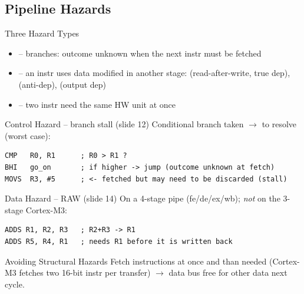 \multend

\subsection{Pipeline Hazards}

\begin{concept}{Three Hazard Types}
    \begin{itemize}
        \item {} -- branches: outcome unknown when the next instr
              must be fetched
        \item {} -- an instr uses data modified in another stage:
               (read-after-write, true dep), 
              (anti-dep),  (output dep)
        \item {} -- two instr need the same HW unit at once
    \end{itemize}
\end{concept}

\begin{examplecode}{Control Hazard -- branch stall (slide 12)}
    Conditional branch taken $\to$  to resolve (worst case):
\begin{lstlisting}[language=armasm, style=basesmol, aboveskip=2pt, belowskip=2pt]
CMP   R0, R1      ; R0 > R1 ?
BHI   go_on       ; if higher -> jump (outcome unknown at fetch)
MOVS  R3, #5      ; <- fetched but may need to be discarded (stall)
\end{lstlisting}
\end{examplecode}


\begin{examplecode}{Data Hazard -- RAW (slide 14)}
    On a 4-stage pipe (fe/de/ex/wb); \emph{not} on the 3-stage Cortex-M3:
\begin{lstlisting}[language=armasm, style=basesmol, aboveskip=2pt, belowskip=2pt]
ADDS R1, R2, R3   ; R2+R3 -> R1
ADDS R5, R4, R1   ; needs R1 before it is written back
\end{lstlisting}
\end{examplecode}

\begin{corollary}{Avoiding Structural Hazards}
    Fetch  instructions at once and  than
    needed (Cortex-M3 fetches two 16-bit instr per transfer) $\to$ data bus free
    for other data next cycle.
\end{corollary}


